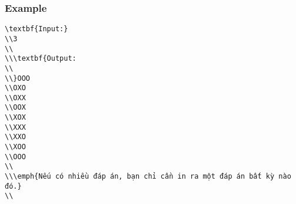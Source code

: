 \subsubsection{   Example  }
\begin{verbatim}
\textbf{Input:}
\\3
\\
\\\textbf{Output:
\\
\\}OOO
\\OXO
\\OXX
\\OOX
\\XOX
\\XXX
\\XXO
\\XOO
\\OOO
\\
\\\emph{Nếu có nhiều đáp án, bạn chỉ cần in ra một đáp án bất kỳ nào đó.}
\\\end{verbatim}
